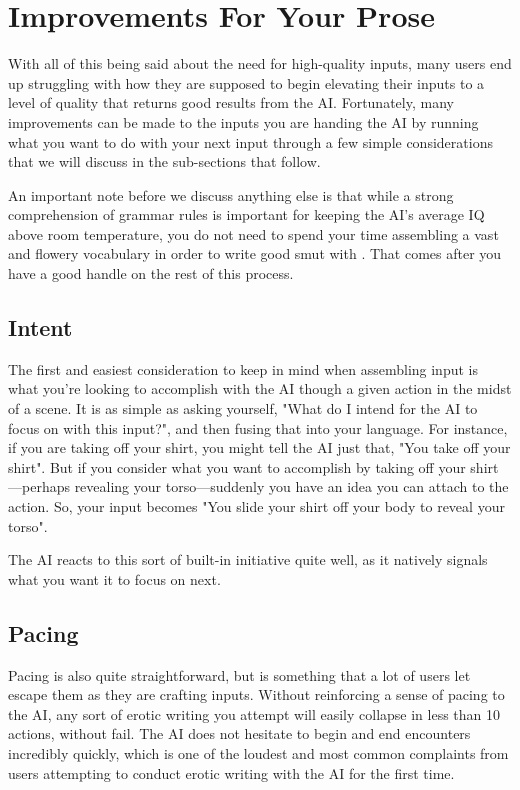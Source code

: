 ﻿\documentclass[Coomer-main.tex]{subfiles}
\begin{document}
\section{Improvements For Your Prose}

With all of this being said about the need for high-quality inputs, many users end up struggling with how they are supposed to begin elevating their inputs to a level of quality that returns good results from the AI.
Fortunately, many improvements can be made to the inputs you are handing the AI by running what you want to do with your next input through a few simple considerations that we will discuss in the sub-sections that follow.

An important note before we discuss anything else is that while a strong comprehension of grammar rules is important for keeping the AI's average IQ above room temperature, you do not need to spend your time assembling a vast and flowery vocabulary in order to write good smut with \aid.
That comes after you have a good handle on the rest of this process.

\subsection{Intent}

The first and easiest consideration to keep in mind when assembling input is what you're looking to accomplish with the AI though a given action in the midst of a scene.
It is as simple as asking yourself, "What do I intend for the AI to focus on with this input?", and then fusing that into your language.
For instance, if you are taking off your shirt, you might tell the AI just that, "You take off your shirt".
But if you consider what you want to accomplish by taking off your shirt—perhaps revealing your torso—suddenly you have an idea you can attach to the action.
So, your input becomes "You slide your shirt off your body to reveal your torso".

The AI reacts to this sort of built-in initiative quite well, as it natively signals what you want it to focus on next.

\subsection{Pacing}

Pacing is also quite straightforward, but is something that a lot of \aid users let escape them as they are crafting inputs.
Without reinforcing a sense of pacing to the AI, any sort of erotic writing you attempt will easily collapse in less than 10 actions, without fail.
The AI does not hesitate to begin and end encounters incredibly quickly, which is one of the loudest and most common complaints from users attempting to conduct erotic writing with the AI for the first time.
\end{document}
